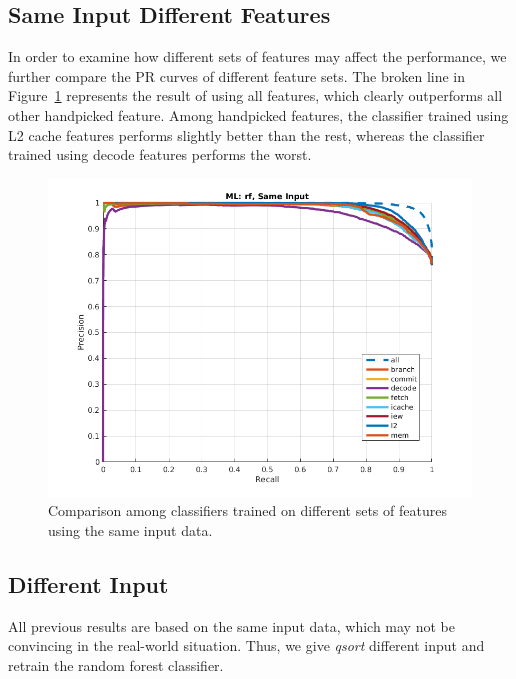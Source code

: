 \subsection{Same Input Different Features}
In order to examine how different sets of features may affect the performance, we further compare the PR curves of different feature sets. The broken line in Figure~\ref{fig:sidf} represents the result of using all features, which clearly outperforms all other handpicked feature. Among handpicked features, the classifier trained using L2 cache features performs slightly better than the rest, whereas the classifier trained using decode features performs the worst.

\begin{figure}[t]
\begin{center}
   \includegraphics[width=0.95\linewidth]{./figures/sidf.png}
\end{center}
   \caption{Comparison among classifiers trained on different sets of features using the same input data.}
\label{fig:sidf}
\end{figure}

\subsection{Different Input}
All previous results are based on the same input data, which may not be convincing in the real-world situation. Thus, we give \emph{qsort} different input and retrain the random forest classifier.

